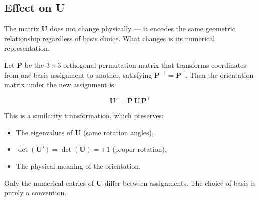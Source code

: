 \documentclass[12pt]{article}
\begin{document}
\subsection*{Effect on \textbf{U}}

The matrix $\mathbf{U}$ does not change physically --- it encodes the same geometric
relationship regardless of basis choice. What changes is its numerical representation.

Let $\mathbf{P}$ be the $3 \times 3$ orthogonal permutation matrix that transforms
coordinates from one basis assignment to another, satisfying $\mathbf{P}^{-1} = \mathbf{P}^\top$.
Then the orientation matrix under the new assignment is:

\begin{equation}
  \mathbf{U}' = \mathbf{P}\,\mathbf{U}\,\mathbf{P}^\top
\end{equation}

This is a similarity transformation, which preserves:

\begin{itemize}
  \item The eigenvalues of $\mathbf{U}$ (same rotation angles),
  \item $\det(\mathbf{U}') = \det(\mathbf{U}) = +1$ (proper rotation),
  \item The physical meaning of the orientation.
\end{itemize}

Only the numerical entries of $\mathbf{U}$ differ between assignments. The choice of
basis is purely a convention.
\end{document}
